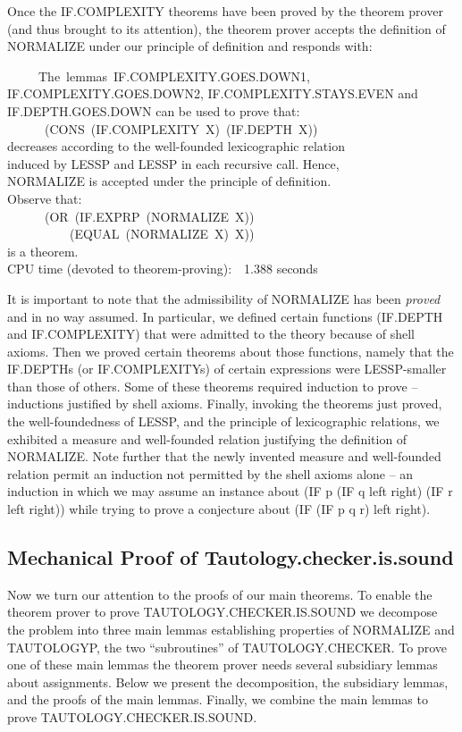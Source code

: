 \documentclass[10pt]{book}
\newenvironment{pubasis}{\begin{flushleft}}{\end{flushleft}}
\begin{document}
Once the IF.COMPLEXITY theorems have been proved by the theorem prover (and thus
brought to its attention), the theorem prover accepts the definition
of NORMALIZE under our principle of definition and responds with:
\begin{pubasis}
~~~~~The~lemmas~IF.COMPLEXITY.GOES.DOWN1,\\
IF.COMPLEXITY.GOES.DOWN2, IF.COMPLEXITY.STAYS.EVEN and\\
IF.DEPTH.GOES.DOWN can be used to prove that:\\
~~~~~~(CONS~(IF.COMPLEXITY~X)~(IF.DEPTH~X))\\
decreases according to the well-founded lexicographic relation\\
induced by LESSP and LESSP in each recursive call.  Hence,\\
NORMALIZE is accepted under the principle of definition.\\
Observe that:\\
~~~~~~(OR~(IF.EXPRP~(NORMALIZE~X))\\
~~~~~~~~~~(EQUAL~(NORMALIZE~X)~X))\\
is a theorem.\\

CPU time (devoted to theorem-proving):~~1.388 seconds\\
\end{pubasis}
It is important to note that the admissibility of NORMALIZE has been
\emph{proved} and in no way assumed.  In particular, we defined certain
functions (IF.DEPTH and IF.COMPLEXITY) that were admitted to the theory
because of shell axioms.  Then we proved certain theorems about those
functions, namely that the IF.DEPTHs (or IF.COMPLEXITYs) of certain
expressions were LESSP-smaller than those of others.  Some of these
theorems required induction to prove -- inductions justified by shell
axioms.  Finally, invoking the theorems just proved, the
well-foundedness of LESSP, and the principle of lexicographic relations, we
exhibited a measure and well-founded relation justifying the definition
of NORMALIZE.  Note
further that the newly invented measure and well-founded relation
permit an induction not permitted by the shell axioms alone -- an induction
in which we may assume an instance about (IF p (IF q left right) (IF r left right)) while trying to prove a conjecture about (IF (IF p q r) left right).

\subsection{Mechanical Proof of Tautology.checker.is.sound}
Now we turn our attention to the proofs of our main theorems.
To enable the theorem prover to prove TAUTOLOGY.CHECKER.IS.SOUND we decompose the problem
into three main lemmas establishing properties of NORMALIZE and TAUTOLOGYP,
the two ``subroutines'' of TAUTOLOGY.CHECKER.  To prove one of these main lemmas
the theorem prover needs several subsidiary lemmas about assignments.  Below we present the
decomposition, the subsidiary
lemmas, and the proofs of the main lemmas.  Finally, we combine
the main lemmas to prove TAUTOLOGY.CHECKER.IS.SOUND.
\end{document}
